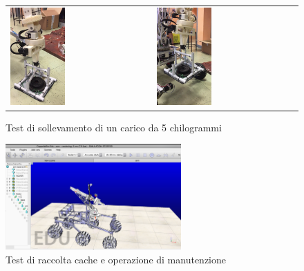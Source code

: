 \documentclass[%
corpo=11pt,
twoside,
 stile=classica,
oldstyle,
greek,%
]{toptesi}
\begin{document}
\begin{figure}
	\centering
	\begin{tabular}{ll}
		\includegraphics[width=0.4\textwidth]{image/5kg1.png}
		&
		\includegraphics[width=0.4\textwidth]{image/5kg2.png}
	\end{tabular}
	\caption{Test di sollevamento di un carico da 5 chilogrammi}
	\label{fig:test1}
\end{figure}
\begin{figure}
	\centering
		\includegraphics[width=0.6\textwidth]{Screen/coppelia.png}
	\caption{Test di raccolta cache e operazione di manutenzione}
	\label{fig:coppelia}
\end{figure}
\end{document}
